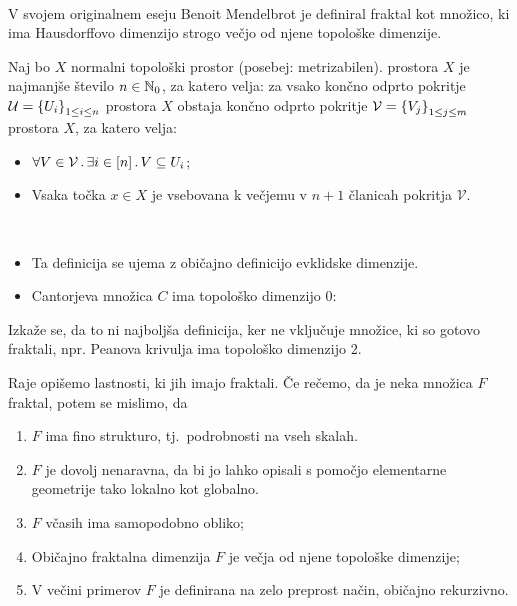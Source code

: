\ 

V svojem originalnem eseju Benoit Mendelbrot je definiral fraktal kot množico, ki ima Hausdorffovo dimenzijo strogo večjo od njene topološke dimenzije. 
\begin{definicija}
    Naj bo \(X\) normalni topološki prostor (posebej: metrizabilen).  prostora \(X\) je najmanjše število \(n \in \mathbb{N}_0\), za katero velja: za vsako končno odprto pokritje \(\mathcal{U} = \left\{U_i\right\}_{1 \leq i \leq n}\) prostora \(X\) obstaja končno odprto pokritje \(\mathcal{V} =  \left\{V_j\right\}_{1 \leq j \leq m}\) prostora \(X\), za katero velja:
    \begin{itemize}
        \item \(\forall V \in \mathcal{V} \,.\, \exists i \in [n] \,.\, V \subseteq U_i\);
        \item Vsaka točka \(x \in X\) je vsebovana k večjemu v \(n + 1\) članicah pokritja \(\mathcal{V}\).
    \end{itemize} 
\end{definicija}

\begin{primer} \ 
    \begin{itemize}
        \item Ta definicija se ujema z običajno definicijo evklidske dimenzije.
        \item Cantorjeva množica \(C\) ima topološko dimenzijo \(0\): \todo{}
    \end{itemize}
\end{primer}

Izkaže se, da to ni najboljša definicija, ker ne vključuje množice, ki so gotovo fraktali, npr. Peanova krivulja ima topološko dimenzijo \(2\).

Raje opišemo lastnosti, ki jih imajo fraktali. Če rečemo, da je neka množica \(F\) fraktal, potem se mislimo, da
\begin{enumerate}
    \item \(F\) ima fino strukturo, tj.\ podrobnosti na vseh skalah.
    \item \(F\) je dovolj nenaravna, da bi jo lahko opisali s pomočjo elementarne geometrije tako lokalno kot globalno.
    \item \(F\) včasih ima samopodobno obliko;
    \item Običajno fraktalna dimenzija \(F\) je večja od njene topološke dimenzije;
    \item V večini primerov \(F\) je definirana na zelo preprost način, običajno rekurzivno.
\end{enumerate}

